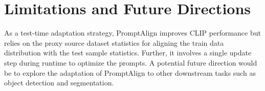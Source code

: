 \begin{table}[!h]
\caption{\textnormal{\textbf{Comparison of different alignment losses.}} L1 Loss yields better alignment due smaller deviation in statistical measures, thus higher gradient values.}
    \tabstyle{4pt}
    \vspace{1em}
    
    \label{tab:loss-grads} \vspace{-1em}
\end{table}
\section{Limitations and Future Directions} 
As a test-time adaptation strategy, PromptAlign improves CLIP performance but relies on the proxy source dataset statistics for aligning the train data distribution with the test sample statistics. Further, it involves a single update step during runtime to optimize the prompts. A potential future direction would be to explore the adaptation of PromptAlign to other downstream tasks such as object detection and segmentation.
